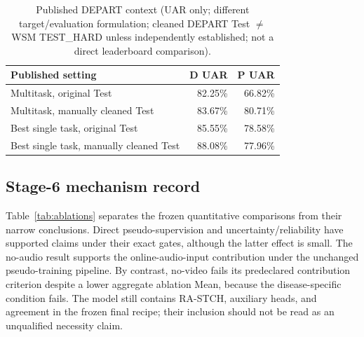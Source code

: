 \begin{table}[t]
\centering\scriptsize
\caption{Published DEPART context (UAR only; different target/evaluation formulation; cleaned DEPART Test $\neq$ WSM TEST\_HARD unless independently established; not a direct leaderboard comparison).}
\label{tab:depart}
\begin{tabular}{lrr}
\toprule
Published setting & D UAR & P UAR\\
\midrule
Multitask, original Test & 82.25\% & 66.82\%\\
Multitask, manually cleaned Test & 83.67\% & 80.71\%\\
Best single task, original Test & 85.55\% & 78.58\%\\
Best single task, manually cleaned Test & 88.08\% & 77.96\%\\
\bottomrule
\end{tabular}
\end{table}

\subsection{Stage-6 mechanism record}

Table~\ref{tab:ablations} separates the frozen quantitative comparisons from their narrow conclusions. Direct pseudo-supervision and uncertainty/reliability have supported claims under their exact gates, although the latter effect is small. The no-audio result supports the online-audio-input contribution under the unchanged pseudo-training pipeline. By contrast, no-video fails its predeclared contribution criterion despite a lower aggregate ablation Mean, because the disease-specific condition fails. The model still contains RA-STCH, auxiliary heads, and agreement in the frozen final recipe; their inclusion should not be read as an unqualified necessity claim.

